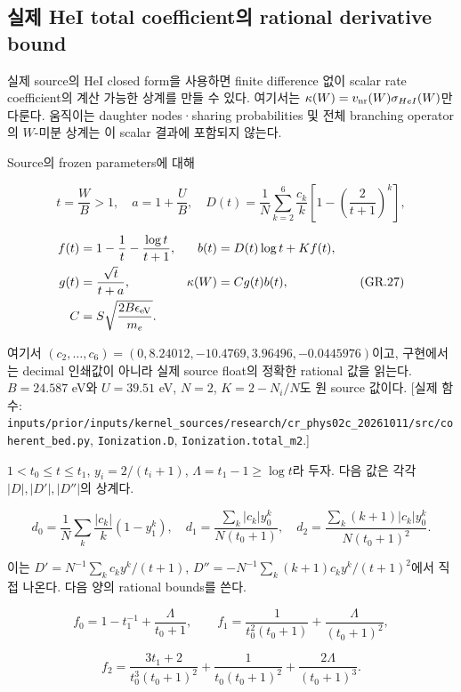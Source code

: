 \hypertarget{uxc2e4uxc81c-hei-total-coefficientuxc758-rational-derivative-bound}{%
\subsection{실제 HeI total coefficient의 rational derivative bound}\label{uxc2e4uxc81c-hei-total-coefficientuxc758-rational-derivative-bound}}

실제 source의 HeI closed form을 사용하면 finite difference 없이 scalar rate coefficient의 계산 가능한 상계를 만들 수 있다. 여기서는 \(\kappa(W)=v_{\rm nr}(W)\sigma_{HeI}(W)\)만 다룬다. 움직이는 daughter nodes·sharing probabilities 및 전체 branching operator의 \(W\)-미분 상계는 이 scalar 결과에 포함되지 않는다.

Source의 frozen parameters에 대해

\[
 t=\frac WB>1,\quad a=1+\frac UB,\quad
 D(t)=\frac1N\sum_{k=2}^{6}\frac{c_k}{k}
       \left[1-\left(\frac2{t+1}\right)^k\right],
\tag{GR.26}
\]

\[
 \begin{aligned}
 f(t)&=1-\frac1t-\frac{\log t}{t+1},
 &b(t)&=D(t)\log t+Kf(t),\\
 g(t)&=\frac{\sqrt t}{t+a},
 &\kappa(W)&=C g(t)b(t),\\
 C&=S\sqrt{\frac{2B\epsilon_{\rm eV}}{m_e}}.
 \end{aligned}
\tag{GR.27}
\]

여기서 \((c_2,\ldots,c_6)=(0,8.24012,-10.4769,3.96496,-0.0445976)\)이고, 구현에서는 decimal 인쇄값이 아니라 실제 source float의 정확한 rational 값을 읽는다. \(B=24.587\) eV와 \(U=39.51\) eV, \(N=2\), \(K=2-N_i/N\)도 원 source 값이다. {[}실제 함수: \nolinkurl{inputs/prior/inputs/kernel_sources/research/cr_phys02c_20261011/src/coherent_bed.py}, \texttt{Ionization.D}, \texttt{Ionization.total\_m2}.{]}

\(1<t_0\le t\le t_1\), \(y_i=2/(t_i+1)\), \(\Lambda=t_1-1\ge\log t\)라 두자. 다음 값은 각각 \(|D|,|D'|,|D''|\)의 상계다.

\[
 d_0=\frac1N\sum_k\frac{|c_k|}{k}(1-y_1^k),\quad
 d_1=\frac{\sum_k|c_k|y_0^k}{N(t_0+1)},\quad
 d_2=\frac{\sum_k(k+1)|c_k|y_0^k}{N(t_0+1)^2}.
\tag{GR.28}
\]

이는 \(D'=N^{-1}\sum_kc_ky^k/(t+1)\), \(D''=-N^{-1}\sum_k(k+1)c_ky^k/(t+1)^2\)에서 직접 나온다. 다음 양의 rational bounds를 쓴다.

\[
 f_0=1-t_1^{-1}+\frac{\Lambda}{t_0+1},\qquad
 f_1=\frac1{t_0^2(t_0+1)}+\frac{\Lambda}{(t_0+1)^2},
\tag{GR.29}
\]

\[
 f_2=\frac{3t_1+2}{t_0^3(t_0+1)^2}
       +\frac1{t_0(t_0+1)^2}+\frac{2\Lambda}{(t_0+1)^3}.
\tag{GR.30}
\]

